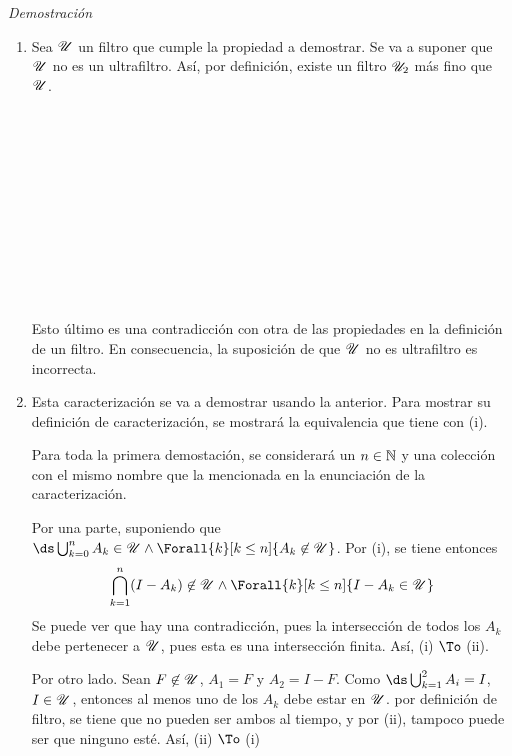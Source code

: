 \documentclass{article}
\theoremstyle{definition}
\begin{document}
\begin{proofbox}[10]{\textit{Demostración}}
  \begin{enumerate}
    \item Sea $\mathscr{U}$ un filtro que cumple la propiedad a demostrar.
          Se va a suponer que $\mathscr{U}$ no es un ultrafiltro. Así, por
          definición, existe un filtro $\mathscr{U}_2$ más fino que $\mathscr{U}$.
            \begin{longderivation}
                \\
              \equiv\\
                \\
              \\
                \\
              \\
                \\
              \equiv\\
                \\
              \\
            \end{longderivation}
          Esto último es una contradicción con otra de las propiedades en la definición
          de un filtro. En consecuencia, la suposición de que $\mathscr{U}$ no es ultrafiltro es
          incorrecta.
    \item Esta caracterización se va a demostrar usando la anterior. Para mostrar
          su definición de caracterización, se mostrará la equivalencia que tiene con (i).

          Para toda la primera demostación, se considerará un $n \in \mathbb{N}$ y una colección con el
          mismo nombre que la mencionada en la enunciación de la caracterización.
          
          Por una parte, suponiendo que $\ds\bigcup_{k=0}^n A_k \in \U \land
          \Forall{k}[k\leq n]{A_k \not\in \U}$. Por (i), se tiene entonces
          \[\bigcap_{k=1}^n (I-A_k) \not\in \U \land \Forall{k}[k\leq n]{I - A_k \in \U}\]
          Se puede ver que hay una contradicción, pues la intersección de todos los $A_k$
          debe pertenecer a $\mathscr{U}$, pues esta es una intersección finita. Así, (i) $\To$ (ii).

          Por otro lado. Sean $F \not\in \mathscr{U}$, $A_1 = F$ y $A_2 = I-F$. Como
          $\ds\bigcup_{k=1}^{2} A_i = I$, $I \in \mathscr{U}$, entonces al menos uno de los
          $A_k$ debe estar en $\mathscr{U}$. por definición de filtro, se tiene que no pueden ser
          ambos al tiempo, y por (ii), tampoco puede ser que ninguno esté. Así, (ii) $\To$ (i)
  \end{enumerate}
\end{proofbox}
\end{document}
